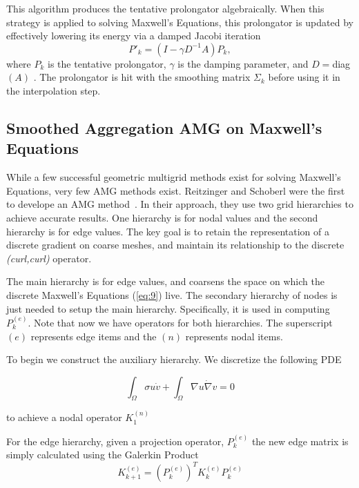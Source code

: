 \documentclass{article}
\begin{document}
This algorithm produces the tentative prolongator algebraically. When this strategy is applied to solving Maxwell's Equations, this prolongator is updated by effectively lowering its energy via a damped Jacobi iteration
\[
P'_{k} = \left(I-\gamma D^{-1}A\right)P_{k},
\]
\noindent where $P_{k}$ is the tentative prolongator, $\gamma$ is the damping parameter, and $D=$diag$\left(A\right)$ \cite{Hu2006}. The prolongator is hit with the smoothing matrix $\Sigma_{k}$ before using it in the interpolation step.

\subsection{Smoothed Aggregation AMG on Maxwell's Equations}

While a few successful geometric multigrid methods exist for solving Maxwell's Equations, very few AMG methods exist.  Reitzinger and Schoberl were the first to develope an AMG method~\cite{reitzinger2002algebraic}. In their approach, they use two grid hierarchies to achieve accurate results.  One hierarchy is for nodal values and the second hierarchy is for edge values.  The key goal is to retain the representation of a discrete gradient on coarse meshes, and maintain its relationship to the discrete \textit{(curl,curl)} operator.  

The main hierarchy is for edge values, and coarsens the space on which the discrete Maxwell's Equations (\ref{eq:9}) live. The secondary hierarchy of nodes is just needed to setup the main hierarchy. Specifically, it is used in computing $P_k^{(e)}$.  Note that now we have operators for both hierarchies. The superscript $(e)$ represents edge items and the $(n)$ represents nodal items. 



To begin we construct the auxiliary hierarchy. We discretize the following PDE 

\begin{equation}

\int_{\Omega} \sigma u \dot v + \int_{\Omega} \nabla u \dot \nabla v = 0

\end{equation}


to achieve a nodal operator $K_1^{(n)}$




For the edge hierarchy, given a projection operator, $P_k^{(e)}$ the new edge matrix is simply calculated using the Galerkin Product
\[
K_{k+1}^{(e)} = (P_k^{(e)})^T K_k^{(e)} P_k^{(e)}
\]
\end{document}
